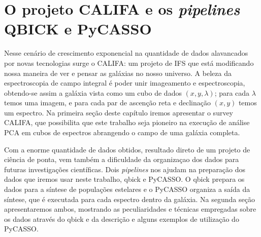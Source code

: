 


\chapter{O projeto CALIFA e os {\em pipelines} QBICK e PyCASSO}
\label{sec:CALePyC}

Nesse cenário de crescimento exponencial na quantidade de dados alavancados por novas tecnologias surge o CALIFA: um
projeto de IFS que está modificando nossa maneira de ver e pensar as galáxias no nosso universo. A beleza da
espectroscopia de campo integral é poder unir imageamento e espectroscopia, obtendo-se assim a galáxia vista como um
cubo de dados $(x, y, \lambda)$; para cada $\lambda$ temos uma imagem, e para cada par de ascenção reta e declinação
$(x, y)$ temos um espectro. Na primeira seção deste capítulo iremos apresentar o survey CALIFA, que possibilita que este
trabalho seja pioneiro na execução de análise PCA em cubos de espectros abrangendo o campo de uma galáxia completa.

Com a enorme quantidade de dados obtidos, resultado direto de um projeto de ciência de ponta, vem também a dificuldade
da organizaçao dos dados para futuras investigações científicas. Dois {\em pipelines} nos ajudam na preparação dos dados
que iremos usar neste trabalho, {\sc qbick} e PyCASSO. O {\sc qbick} prepara os dados para a síntese de populações
estelares e o PyCASSO organiza a saída da síntese, que é executada para cada espectro dentro da galáxia. Na segunda
seção apresentaremos ambos, mostrando as peculiaridades e técnicas empregadas sobre os dados através do {\sc qbick} e da
descrição e alguns exemplos de utilização do PyCASSO.

